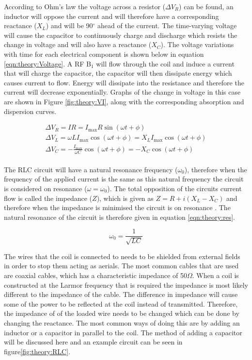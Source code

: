 \documentclass[class=article, crop=false]{standalone}
\begin{document}
According to Ohm's law the voltage across a resistor ($\Delta V_R$) can be found, an inductor will oppose the current and will therefore have a corresponding reactance ($X_L$) and will be 90$^\circ$ ahead of the current. The time-varying voltage will cause the capacitor to continuously charge and discharge which resists the change in voltage and will also have a reactance ($X_C$). The voltage variations with time for each electrical component is shown below in equation \ref{eqn:theory:Voltage}. A RF B$_1$ will flow through the coil and induce a current that will charge the capacitor, the capacitor will then dissipate energy which causes current to flow. Energy will dissipate into the resistance and therefore the current will decrease exponentially. Graphs of the change in voltage in this case are shown in Figure \ref{fig:theory:VI}, along with the corresponding absorption and dispersion curves.  

\begin{equation}
\begin{gathered}
    \Delta V_R = IR = I_{\mathrm{max}}R\sin(\omega t + \phi) \\
    \Delta V_L = \omega LI_{\mathrm{max}}\cos(\omega t + \phi) =  X_LI_{\mathrm{max}}\cos(\omega t + \phi)\\
    \Delta V_C = -\frac{I_{\mathrm{max}}}{\omega C}\cos(\omega t + \phi) = -X_C\cos(\omega t + \phi)\\
    \label{eqn:theory:Voltage}
\end{gathered}
\end{equation}

The RLC circuit will have a natural resonance frequency ($\omega_0$), therefore when the frequency of the applied current is the same as this natural frequency the circuit is considered on resonance ($\omega=\omega_0$). The total opposition of the circuits current flow is called the impedance ($Z$), which is given as $Z = R+i(X_L-X_C)$ and therefore when the impedance is minimised the circuit is on resonance \cite{deGraaf2019InSpectroscopy}. The natural resonance of the circuit is therefore given in equation \ref{eqn:theory:res}.

\begin{equation}
    \omega_0 = \frac{1}{\sqrt{LC}}
    \label{eqn:theory:res}
\end{equation}

The wires that the coil is connected to needs to be shielded from external fields in order to stop them acting as aerials. The most common cables that are used are coaxial cables, which has a characteristic impedance of 50$\Omega$. When a coil is constructed at the Larmor frequency that is required the impedance is most likely different to the impedance of the cable. The difference in impedance will cause some of the power to be reflected at the coil instead of transmitted. Therefore, the impedance of of the loaded wire needs to be changed which can be done by changing the reactance. The most common ways of doing this are by adding an inductor or a capacitor in parallel to the coil. The method of adding a capacitor will be discussed here and an example circuit can be seen in figure\ref{fig:theory:RLC}.
\end{document}
